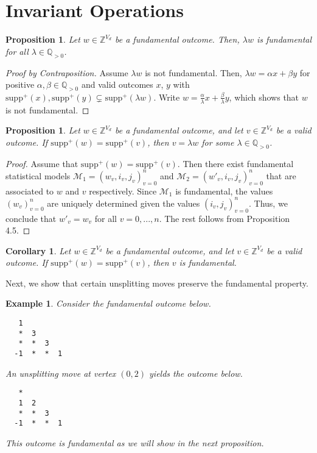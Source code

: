 \documentclass[11pt]{article}
\newtheorem{proposition}[theorem]{Proposition}
\newtheorem{corollary}[theorem]{Corollary}
\newtheorem{example}[theorem]{Example}
\begin{document}
\section{Invariant Operations}


\begin{proposition}
  Let $w \in \mathbb{Z}^{V_{d}}$ be a fundamental outcome. Then, $\lambda w$ is fundamental for all $\lambda \in \mathbb Q_{>0}$.
\end{proposition}


\begin{proof}[Proof by Contraposition]
  Assume $\lambda w$ is not fundamental. Then, $\lambda w = \alpha x + \beta y$ for positive $\alpha, \beta \in \mathbb Q_{>0}$ and valid outcomes $x$, $y$ with $\mathrm{supp}^+(x), \mathrm{supp}^+(y) \subsetneq \mathrm{supp}^+(\lambda w)$. Write $w = \frac{\alpha}{\lambda} x + \frac{\beta}{\lambda}y$, which shows that $w$ is not fundamental.
\end{proof}

\begin{proposition}
  Let $w \in \mathbb{Z}^{V_{d}}$ be a fundamental outcome, and let $v \in \mathbb{Z}^{V_{d}}$ be a valid outcome. 
  If $\mathrm{supp}^+(w) = \mathrm{supp}^+(v)$, then $v = \lambda w$ for some $\lambda \in \mathbb Q_{>0}$.
\end{proposition}

\begin{proof}
  Assume that $\mathrm{supp}^+(w) = \mathrm{supp}^+(v)$. Then there exist fundamental statistical models $\mathcal M_{1} = (w_{v}, i_{v}, j_{v})_{v = 0}^n$ and $\mathcal M_{2} = (w'_v, i_{v}, j_{v})_{v=0}^n$ that are associated to $w$ and $v$ respectively. Since $\mathcal M_{1}$ is fundamental, the values $(w_{v})_{v=0}^n$ are uniquely determined given the values $(i_{v}, j_{v})_{v=0}^n$. Thus, we conclude that $w'_v = w_{v}$ for all $v = 0, ..., n$. The rest follows from Proposition 4.5.
\end{proof}

\begin{corollary}
  Let $w \in \mathbb{Z}^{V_{d}}$ be a fundamental outcome, and let $v \in \mathbb{Z}^{V_{d}}$ be a valid outcome. 
  If $\mathrm{supp}^+(w) = \mathrm{supp}^+(v)$, then $v$ is fundamental.
\end{corollary}

Next, we show that certain unsplitting moves preserve the fundamental property.

\begin{example}
  Consider the fundamental outcome below.
 \begin{verbatim}
   1
   *  3
   *  *  3
  -1  *  *  1
 \end{verbatim}
  An unsplitting move at vertex $(0,2)$ yields the outcome below.
 \begin{verbatim}
   * 
   1  2 
   *  *  3
  -1  *  *  1
 \end{verbatim}
 This outcome is fundamental as we will show in the next proposition.
\end{example}
\end{document}

